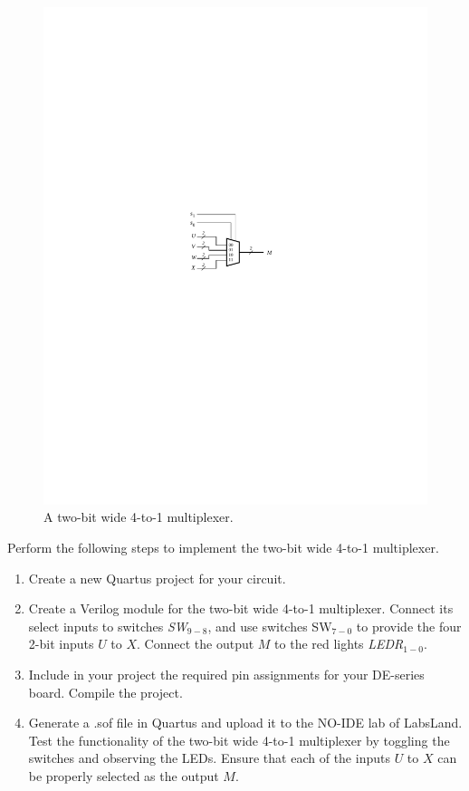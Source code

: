 \documentclass[epsfig,10pt,fullpage]{article}
\begin{document}
\begin{figure}[H]
	\begin{center}
		\includegraphics[]{figures/figure5.pdf}
	\end{center}
\caption{A two-bit wide 4-to-1 multiplexer.}
\label{fig:5}
\end{figure}

Perform the following steps to implement the two-bit wide 4-to-1 multiplexer.
\begin{enumerate}
\item Create a new Quartus project for your circuit.
\item Create a Verilog module for the two-bit wide 4-to-1 multiplexer. Connect its select
inputs to switches {\it SW}$_{9-8}$, and use switches SW$_{7-0}$ to
provide the four 2-bit inputs $U$ to $X$. Connect the 
output $M$ to the red lights {\it LEDR}$_{1-0}$.
\item Include in your project the required pin assignments for your DE-series board.
Compile the project.
\item Generate a .sof file in Quartus and upload it to the NO-IDE lab of LabsLand. Test the functionality of the 
two-bit wide 4-to-1 multiplexer by toggling the switches and observing the LEDs. Ensure
that each of the inputs $U$ to $X$ can be properly selected as the output $M$.
\end{enumerate}
\end{document}
